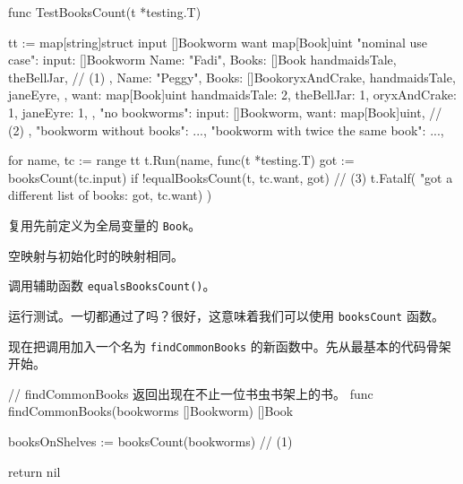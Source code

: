 \begin{gocode}[title={代码清单 3.14 \texttt{bookworms\_internal\_test.go}：测试 \texttt{booksCount}}]
func TestBooksCount(t *testing.T) {
    tt := map[string]struct {
        input []Bookworm
        want  map[Book]uint
    }{
        "nominal use case": {
            input: []Bookworm{
                {Name: "Fadi", Books: []Book{
                    handmaidsTale, theBellJar, // (1)
                }},
                {Name: "Peggy", Books:
                    []Book{oryxAndCrake, handmaidsTale, janeEyre}},
            },
            want: map[Book]uint{
                handmaidsTale: 2,
                theBellJar: 1,
                oryxAndCrake: 1,
                janeEyre: 1},
        },
        "no bookworms": {
            input: []Bookworm{},
            want: map[Book]uint{}, // (2)
        },
        "bookworm without books": {...},
        "bookworm with twice the same book": {...},
    }

    for name, tc := range tt {
        t.Run(name, func(t *testing.T) {
            got := booksCount(tc.input)
            if !equalBooksCount(t, tc.want, got) { // (3)
                t.Fatalf(
                    "got a different list of books: %
                    got, tc.want)
            }
        })
    }
}
\end{gocode}

\begin{codeannotations}
  \item 复用先前定义为全局变量的 \texttt{Book}。
  \item 空映射与初始化时的映射相同。
  \item 调用辅助函数 \texttt{equalsBooksCount()}。
\end{codeannotations}

运行测试。一切都通过了吗？很好，这意味着我们可以使用 \texttt{booksCount} 函数。

现在把调用加入一个名为 \texttt{findCommonBooks} 的新函数中。先从最基本的代码骨架开始。

\begin{gocode}[title={代码清单 3.15 \texttt{bookworm.go}：调用 \texttt{booksCount()} 的 \texttt{findCommonBooks()}}]
// findCommonBooks 返回出现在不止一位书虫书架上的书。
func findCommonBooks(bookworms []Bookworm) []Book {
    booksOnShelves := booksCount(bookworms) // (1)

    return nil
}
\end{gocode}


